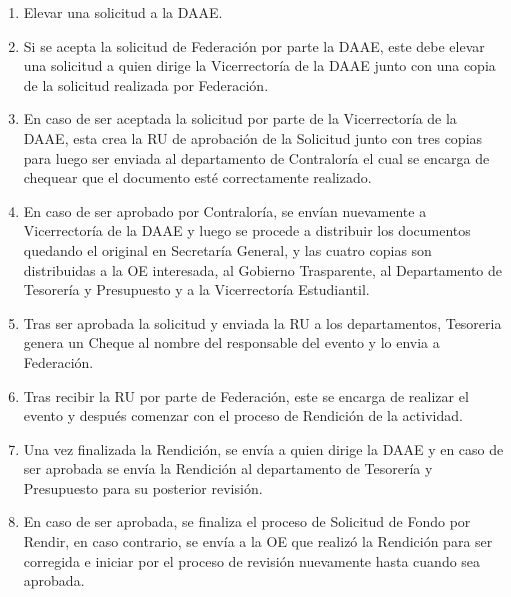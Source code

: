 \begin{enumerate}
    \item Elevar una solicitud a la DAAE. 
    \item Si se acepta la solicitud de Federación por parte la DAAE, este debe elevar una solicitud a quien dirige la Vicerrectoría de la DAAE junto con una copia de la solicitud realizada por Federación. 
    \item En caso de ser aceptada la solicitud por parte de la Vicerrectoría de la DAAE, esta crea la RU de aprobación de la Solicitud junto con tres copias para luego ser enviada al departamento de Contraloría el cual se encarga de chequear que el documento esté correctamente realizado. 
    \item En caso de ser aprobado por Contraloría, se envían nuevamente a Vicerrectoría de la DAAE y luego se procede a distribuir los documentos quedando el original en Secretaría General, y las cuatro copias son distribuidas a la OE interesada, al Gobierno Trasparente, al Departamento de Tesorería y Presupuesto y a la Vicerrectoría Estudiantil.
    \item Tras ser aprobada la solicitud y enviada la RU a los departamentos, Tesoreria genera un Cheque al nombre del responsable del evento y lo envia a Federación.
    \item Tras recibir la RU por parte de Federación, este se encarga de realizar el evento y después comenzar con el proceso de Rendición de la actividad. 
    \item Una vez finalizada la Rendición, se envía a quien dirige la DAAE y en caso de ser aprobada se envía la Rendición al departamento de Tesorería y Presupuesto para su posterior revisión.
    \item En caso de ser aprobada, se finaliza el proceso de Solicitud de Fondo por Rendir, en caso contrario, se envía a la OE que realizó la Rendición para ser corregida e iniciar por el proceso de revisión nuevamente hasta cuando sea aprobada.
\end{enumerate}

